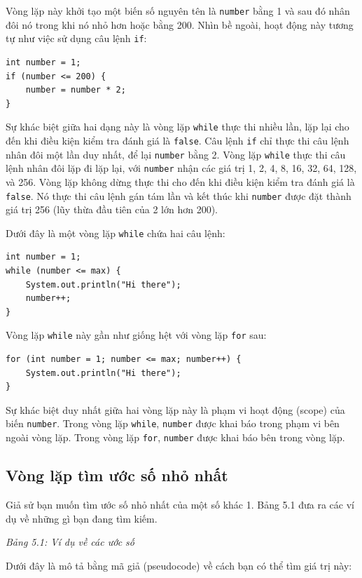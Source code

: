 Vòng lặp này khởi tạo một biến số nguyên tên là \texttt{number} bằng 1 và sau đó nhân đôi nó trong khi nó nhỏ hơn hoặc bằng 200. Nhìn bề ngoài, hoạt động này tương tự như việc sử dụng câu lệnh \texttt{if}:

\begin{verbatim}
int number = 1;
if (number <= 200) {
    number = number * 2;
}
\end{verbatim}

Sự khác biệt giữa hai dạng này là vòng lặp \texttt{while} thực thi nhiều lần, lặp lại cho đến khi điều kiện kiểm tra đánh giá là \texttt{false}. Câu lệnh \texttt{if} chỉ thực thi câu lệnh nhân đôi một lần duy nhất, để lại \texttt{number} bằng 2. Vòng lặp \texttt{while} thực thi câu lệnh nhân đôi lặp đi lặp lại, với \texttt{number} nhận các giá trị 1, 2, 4, 8, 16, 32, 64, 128, và 256. Vòng lặp không dừng thực thi cho đến khi điều kiện kiểm tra đánh giá là \texttt{false}. Nó thực thi câu lệnh gán tám lần và kết thúc khi \texttt{number} được đặt thành giá trị 256 (lũy thừa đầu tiên của 2 lớn hơn 200).

Dưới đây là một vòng lặp \texttt{while} chứa hai câu lệnh:

\begin{verbatim}
int number = 1;
while (number <= max) {
    System.out.println("Hi there");
    number++;
}
\end{verbatim}

Vòng lặp \texttt{while} này gần như giống hệt với vòng lặp \texttt{for} sau:

\begin{verbatim}
for (int number = 1; number <= max; number++) {
    System.out.println("Hi there");
}
\end{verbatim}

Sự khác biệt duy nhất giữa hai vòng lặp này là phạm vi hoạt động (scope) của biến \texttt{number}. Trong vòng lặp \texttt{while}, \texttt{number} được khai báo trong phạm vi bên ngoài vòng lặp. Trong vòng lặp \texttt{for}, \texttt{number} được khai báo bên trong vòng lặp.

\subsection*{Vòng lặp tìm ước số nhỏ nhất}
Giả sử bạn muốn tìm ước số nhỏ nhất của một số khác 1. Bảng 5.1 đưa ra các ví dụ về những gì bạn đang tìm kiếm.

\textit{Bảng 5.1: Ví dụ về các ước số}

Dưới đây là mô tả bằng mã giả (pseudocode) về cách bạn có thể tìm giá trị này:

